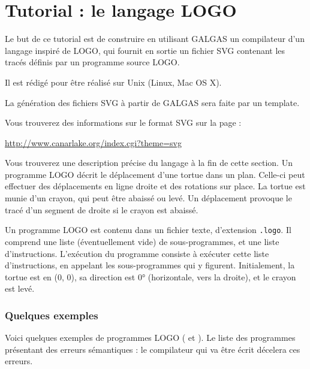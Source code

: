 
\chapter{Tutorial : le langage LOGO}

Le but de ce tutorial est de construire en utilisant GALGAS un compilateur d’un langage inspiré de LOGO, qui fournit en sortie un fichier SVG contenant les tracés définis par un programme source LOGO.


Il est rédigé pour être réalisé sur Unix (Linux, Mac OS X).

La génération des fichiers SVG à partir de GALGAS sera faite par un template.

Vous trouverez des informations sur le format SVG sur la page :

\url{http://www.canarlake.org/index.cgi?theme=svg}


Vous trouverez une description précise du langage à la fin de cette section. Un programme LOGO décrit le déplacement d'une tortue dans un plan. Celle-ci peut effectuer des déplacements en ligne droite et des rotations sur place. La tortue est munie d'un crayon, qui peut être abaissé ou levé. Un déplacement provoque le tracé d'un segment de droite si le crayon est abaissé.

Un programme LOGO est contenu dans un fichier texte, d'extension \texttt{.logo}. Il comprend une liste (éventuellement vide) de sous-programmes, et une liste d'instructions. L'exécution du programme consiste à exécuter cette liste d'instructions, en appelant les sous-programmes qui y figurent. Initialement, la tortue est en (0, 0), sa direction est 0° (horizontale, vers la droite), et le crayon est levé.


\subsection{Quelques exemples}

Voici quelques exemples de programmes LOGO ( et ). Le  liste des programmes présentant des erreurs sémantiques : le compilateur qui va être écrit décelera ces erreurs.


